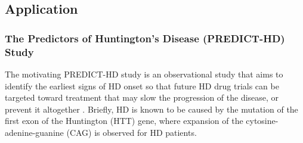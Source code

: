 



% 
\subsection{Application}\label{sec:data}

\subsubsection{The Predictors of Huntington's Disease (PREDICT-HD) Study}\label{sec:data_analysis}
The motivating PREDICT-HD study is an observational study that aims to identify the earliest signs of HD onset so that future HD drug trials can be targeted toward treatment that may slow the progression of the disease, or prevent it altogether \citep{paulsen2008detection}. Briefly, HD is known to be caused by the mutation of the first exon of the Huntington (HTT) gene, where expansion of the cytosine-adenine-guanine (CAG) is observed for HD patients.\par

